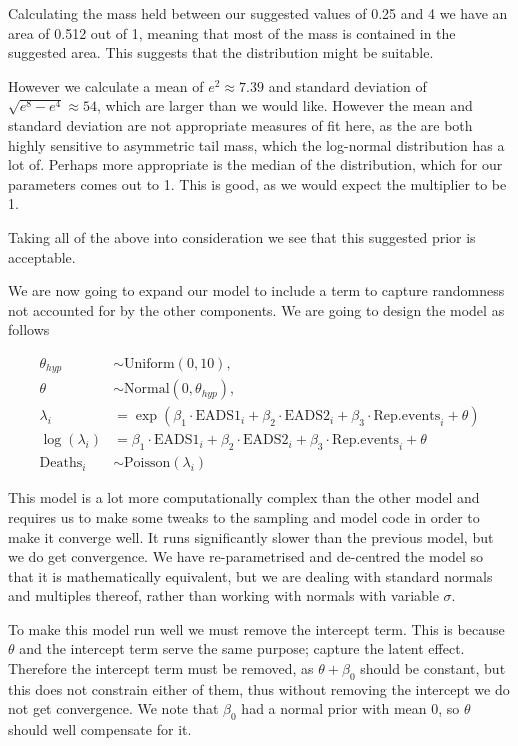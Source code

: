 \documentclass[10pt]{extarticle}
\begin{document}
Calculating the mass held between our suggested values of 0.25 and 4 we have an area of 0.512 out of 1, meaning that most of the mass is contained in the suggested area. This suggests that the distribution might be suitable. 

However we calculate a mean of $e^2 \approx 7.39$ and standard deviation of $\sqrt{e^8 - e^4} \approx 54$, which are larger than we would like. However the mean and standard deviation are not appropriate measures of fit here, as the are both highly sensitive to asymmetric tail mass, which the log-normal distribution has a lot of. Perhaps more appropriate is the median of the distribution, which for our parameters comes out to 1. This is good, as we would expect the multiplier to be 1.

Taking all of the above into consideration we see that this suggested prior is acceptable.

We are now going to expand our model to include a term to capture randomness not accounted for by the other components. We are going to design the model as follows

\begin{align*}
\theta_{hyp} &\sim \mathrm{Uniform}(0, 10),\\
\theta &\sim \mathrm{Normal}(0, \theta_{hyp}),\\
\lambda_i &= \exp(\beta_1 \cdot \mathrm{EADS1}_i + \beta_2 \cdot \mathrm{EADS2}_i + \beta_3 \cdot \mathrm{Rep.events}_i + \theta)\\
\log(\lambda_i) &= \beta_1 \cdot \mathrm{EADS1}_i + \beta_2 \cdot \mathrm{EADS2}_i + \beta_3 \cdot \mathrm{Rep.events}_i + \theta\\
\mathrm{Deaths}_i &\sim \mathrm{Poisson}(\lambda_i)
\end{align*} 

This model is a lot more computationally complex than the other model and requires us to make some tweaks to the sampling and model code in order to make it converge well. It runs significantly slower than the previous model, but we do get convergence. We have re-parametrised and de-centred the model so that it is mathematically equivalent, but we are dealing with standard normals and multiples thereof, rather than working with normals with variable $\sigma$. 

To make this model run well we must remove the intercept term. This is because $\theta$ and the intercept term serve the same purpose; capture the latent effect. Therefore the intercept term must be removed, as $\theta + \beta_0$ should be constant, but this does not constrain either of them, thus without removing the intercept we do not get convergence. We note that $\beta_0$ had a normal prior with mean 0, so $\theta$ should well compensate for it.
\end{document}
